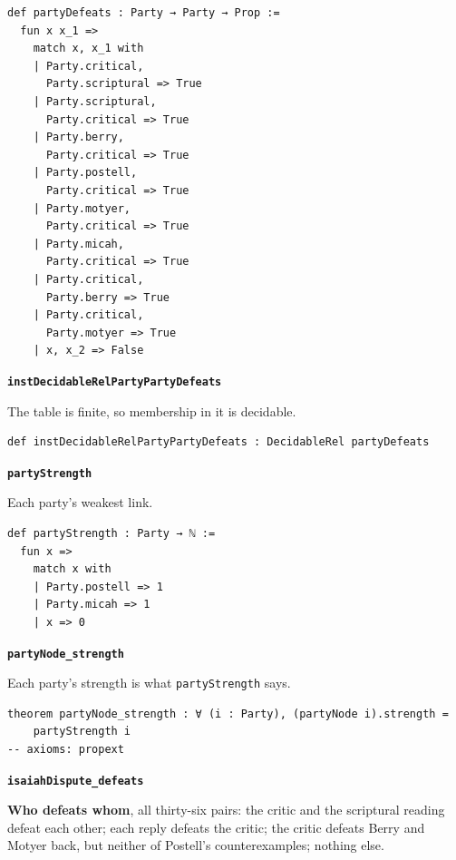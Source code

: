 \documentclass[11pt]{article}
\begin{document}
{\small\begin{verbatim}
def partyDefeats : Party → Party → Prop :=
  fun x x_1 =>
    match x, x_1 with
    | Party.critical,
      Party.scriptural => True
    | Party.scriptural,
      Party.critical => True
    | Party.berry,
      Party.critical => True
    | Party.postell,
      Party.critical => True
    | Party.motyer,
      Party.critical => True
    | Party.micah,
      Party.critical => True
    | Party.critical,
      Party.berry => True
    | Party.critical,
      Party.motyer => True
    | x, x_2 => False
\end{verbatim}}
\par\medskip\noindent\textbf{\texttt{inst\allowbreak{}Decidable\allowbreak{}Rel\allowbreak{}Party\allowbreak{}Party\allowbreak{}Defeats}}\par\nobreak\noindent
The table is finite, so membership in it is decidable.

{\small\begin{verbatim}
def instDecidableRelPartyPartyDefeats : DecidableRel partyDefeats
\end{verbatim}}
\par\medskip\noindent\textbf{\texttt{party\allowbreak{}Strength}}\par\nobreak\noindent
Each party's weakest link.

{\small\begin{verbatim}
def partyStrength : Party → ℕ :=
  fun x =>
    match x with
    | Party.postell => 1
    | Party.micah => 1
    | x => 0
\end{verbatim}}
\par\medskip\noindent\textbf{\texttt{party\allowbreak{}Node\_\allowbreak{}strength}}\par\nobreak\noindent
Each party's strength is what \texttt{party\allowbreak{}Strength} says.

{\small\begin{verbatim}
theorem partyNode_strength : ∀ (i : Party), (partyNode i).strength =
    partyStrength i
-- axioms: propext
\end{verbatim}}
\par\medskip\noindent\textbf{\texttt{isaiah\allowbreak{}Dispute\_\allowbreak{}defeats}}\par\nobreak\noindent
\textbf{Who defeats whom}, all thirty-six pairs: the critic and the scriptural reading defeat each other; each reply defeats the critic; the critic defeats Berry and Motyer back, but neither of Postell's counterexamples; nothing else.
\end{document}
